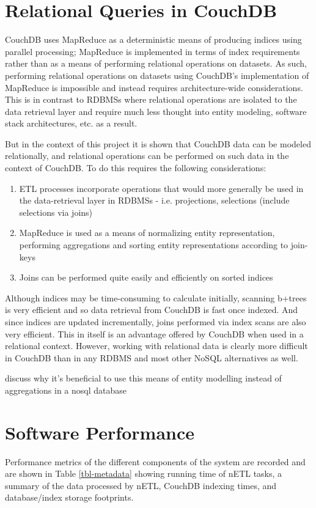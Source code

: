 \section{Relational Queries in CouchDB}
CouchDB uses MapReduce as a deterministic means of producing indices using parallel processing; MapReduce is implemented in terms of index requirements rather than as a means of performing relational operations on datasets. As such, performing relational operations on datasets using CouchDB's implementation of MapReduce is impossible and instead requires architecture-wide considerations. This is in contrast to RDBMSs where relational operations are isolated to the data retrieval layer and require much less thought into entity modeling, software stack architectures, etc. as a result.

But in the context of this project it is shown that CouchDB data can be modeled relationally, and relational operations can be performed on such data in the context of CouchDB. To do this requires the following considerations:

\begin{enumerate}
    \item ETL processes incorporate operations that would more generally be used in the data-retrieval layer in RDBMSs - i.e. projections, selections (include selections via joins)
    \item MapReduce is used as a means of normalizing entity representation, performing aggregations and sorting entity representations according to join-keys
    \item Joins can be performed quite easily and efficiently on sorted indices
\end{enumerate}

Although indices may be time-consuming to calculate initially, scanning b+trees is very efficient and so data retrieval from CouchDB is fast once indexed. And since indices are updated incrementally, joins performed via index scans are also very efficient. This in itself is an advantage offered by CouchDB when used in a relational context. However, working with relational data is clearly more difficult in CouchDB than in any RDBMS and most other NoSQL alternatives as well.

discuss why it's beneficial to use this means of entity modelling instead of aggregations in a nosql database

\section{Software Performance}
Performance metrics of the different components of the system are recorded and are shown in Table \ref{tbl-metadata} showing running time of nETL tasks, a summary of the data processed by nETL, CouchDB indexing times, and database/index storage footprints.


